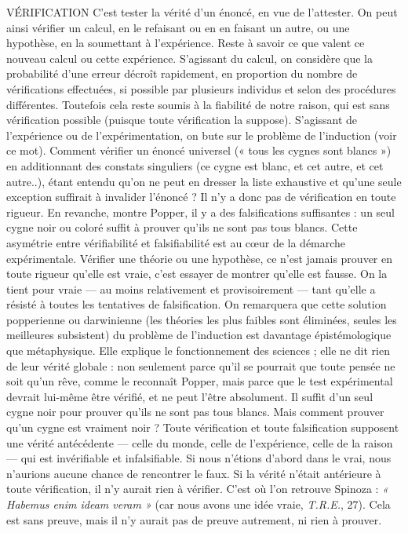 VÉRIFICATION C’est tester la vérité d’un énoncé, en vue de l’attester. On
peut ainsi vérifier un calcul, en le refaisant ou en en faisant
un autre, ou une hypothèse, en la soumettant à l'expérience. Reste à savoir ce
que valent ce nouveau calcul ou cette expérience. S'agissant du calcul, on considère
que la probabilité d’une erreur décroît rapidement, en proportion du
nombre de vérifications effectuées, si possible par plusieurs individus et selon
des procédures différentes. Toutefois cela reste soumis à la fiabilité de notre
raison, qui est sans vérification possible (puisque toute vérification la suppose).
S'agissant de l'expérience ou de l’expérimentation, on bute sur le problème de
l'induction (voir ce mot). Comment vérifier un énoncé universel (« tous les
cygnes sont blancs ») en additionnant des constats singuliers (ce cygne est
blanc, et cet autre, et cet autre..), étant entendu qu’on ne peut en dresser la
liste exhaustive et qu’une seule exception suffirait à invalider l'énoncé ? Il n’y a
donc pas de vérification en toute rigueur. En revanche, montre Popper, il y a
des falsifications suffisantes : un seul cygne noir ou coloré suffit à prouver qu’ils
ne sont pas tous blancs. Cette asymétrie entre vérifiabilité et falsifiabilité est au
cœur de la démarche expérimentale. Vérifier une théorie ou une hypothèse, ce
n’est jamais prouver en toute rigueur qu’elle est vraie, c’est essayer de montrer
qu’elle est fausse. On la tient pour vraie — au moins relativement et provisoirement
— tant qu'elle a résisté à toutes les tentatives de falsification. On remarquera
que cette solution popperienne ou darwinienne (les théories les plus
faibles sont éliminées, seules les meilleures subsistent) du problème de l’induction
est davantage épistémologique que métaphysique. Elle explique le fonctionnement
des sciences ; elle ne dit rien de leur vérité globale : non seulement
parce qu’il se pourrait que toute pensée ne soit qu’un rêve, comme le reconnaît
Popper, mais parce que le test expérimental devrait lui-même être vérifié, et ne
peut l’être absolument. Il suffit d’un seul cygne noir pour prouver qu’ils ne
sont pas tous blancs. Mais comment prouver qu’un cygne est vraiment noir ?
Toute vérification et toute falsification supposent une vérité antécédente — celle
du monde, celle de l'expérience, celle de la raison — qui est invérifiable et infalsifiable.
Si nous n’étions d’abord dans le vrai, nous n’aurions aucune chance de
rencontrer le faux. Si la vérité n’était antérieure à toute vérification, il n’y aurait
rien à vérifier. C’est où l’on retrouve Spinoza : {\it « Habemus enim ideam veram »}
(car nous avons une idée vraie, {\it T.R.E.}, 27). Cela est sans preuve, mais il n’y
aurait pas de preuve autrement, ni rien à prouver.

